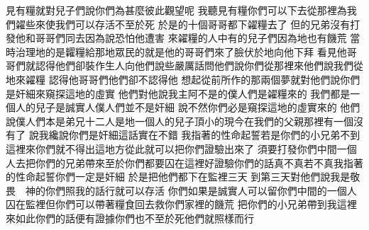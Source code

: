 \bchapter%
見有糧\chientien 就對兒子們說\chientien 你們為甚麼彼此觀望呢\chuan 
{}我聽見有糧\chientien 你們可以下去從那裡為我們糴些來\chientien 使我們可以存活\chientien 不至於死\chuan 
{}於是的十個哥哥都下糴糧去了\chuan 
{}但的兄弟\chientien{}沒有打發他和哥哥們同去\chientien 因為說\chientien 恐怕他遭害\chuan 
{}來糴糧的人中有的兒子們\chientien 因為地也有饑荒\chuan 
{}當時治理地的是\chientien 糶糧給那地眾民的就是他\chuan{}的哥哥們來了\chientien 臉伏於地\chientien 向他下拜\chuan 
{}看見他哥哥們\chientien 就認得他們\chientien 卻裝作生人\chientien 向他們說些嚴厲話\chientien 問他們說\chientien 你們從那裡來\yuentien 他們說\chientien 我們從地來糴糧\chuan 
{}認得他哥哥們\chientien 他們卻不認得他\chuan 
{}想起從前所作的那兩個夢\chientien 就對他們說\chientien 你們是奸細\chientien 來窺探這地的虛實\chuan 
{}他們對他說\chientien 我主阿\chientien 不是的\chientien 僕人們是糴糧來的\chientien 
{}我們都是一個人的兒子\chientien 是誠實人\chientien 僕人們並不是奸細\chuan 
{}說\chientien 不然\chientien 你們必是窺探這地的虛實來的\chuan 
{}他們說\chientien 僕人們本是弟兄十二人\chientien 是地一個人的兒子\chientien 頂小的現今在我們的父親那裡\chientien 有一個沒有了\chuan 
{}說\chientien 我纔說你們是奸細\chientien 這話實在不錯\chientien 
{}我指著的性命起誓\chientien 若是你們的小兄弟\chientien 不到這裡來\chientien 你們就不得出這地方\chientien 從此就可以把你們證驗出來了\yuentien{}
須要打發你們中間一個人去\chientien 把你們的兄弟帶來\chientien 至於你們\chientien 都要囚在這裡\chientien 好證驗你們的話真不真\chientien 若不真\chientien 我指著的性命起誓\chientien 你們一定是奸細\chuan 
{}於是把他們都下在監裡三天\chuan\Chuan
{}到第三天\chientien{}對他們說\chientien 我是敬畏　神的\chientien 你們照我的話行\chientien 就可以存活\yuentien 
{}你們如果是誠實人\chientien 可以留你們中間的一個人囚在監裡\chientien 但你們可以帶著糧食回去\chientien 救你們家裡的饑荒\yuentien 
{}把你們的小兄弟帶到我這裡來\chientien 如此\chientien 你們的話便有證據\chientien 你們也不至於死\yuentien 他們就照樣而行\chuan 
